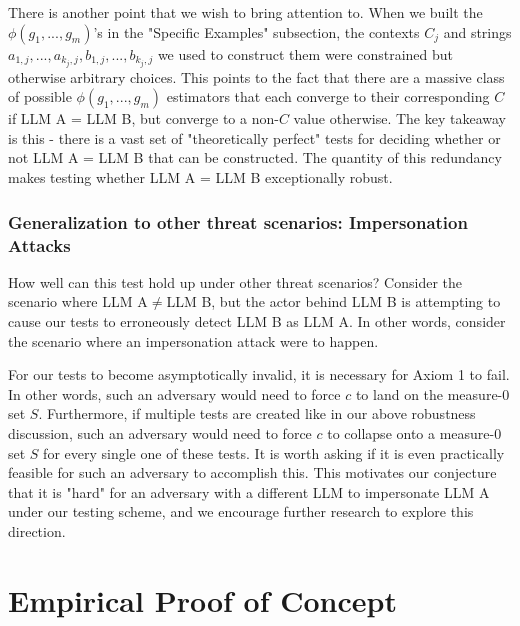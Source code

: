 \documentclass{article}
\begin{document}
There is another point that we wish to bring attention to. When we built the $\displaystyle \phi \left( g_{1} ,...,g_{m}\right)$'s in the "Specific Examples" subsection, the contexts $\displaystyle C_{j}$ and strings $\displaystyle a_{1,j} ,...,a_{k_{j} ,j} ,b_{1,j} ,...,b_{k_{j} ,j}$ we used to construct them were constrained but otherwise arbitrary choices. This points to the fact that there are a massive class of possible $\displaystyle \phi \left( g_{1} ,...,g_{m}\right)$ estimators that each converge to their corresponding $\displaystyle C$ if LLM A = LLM B, but converge to a non-$\displaystyle C$ value otherwise. The key takeaway is this - there is a vast set of "theoretically perfect" tests for deciding whether or not LLM A = LLM B that can be constructed. The quantity of this redundancy makes testing whether LLM A = LLM B exceptionally robust.



\subsubsection{Generalization to other threat scenarios: Impersonation Attacks}

How well can this test hold up under other threat scenarios? Consider the scenario where LLM A$\displaystyle \neq $LLM B, but the actor behind LLM B is attempting to cause our tests to erroneously detect LLM B as LLM A. In other words, consider the scenario where an impersonation attack were to happen.



For our tests to become asymptotically invalid, it is necessary for Axiom 1 to fail. In other words, such an adversary would need to force $\displaystyle c$ to land on the measure-0 set $\displaystyle S$. Furthermore, if multiple tests are created like in our above robustness discussion, such an adversary would need to force $\displaystyle c$ to collapse onto a measure-0 set $\displaystyle S$ for every single one of these tests. It is worth asking if it is even practically feasible for such an adversary to accomplish this. This motivates our conjecture that it is "hard" for an adversary with a different LLM to impersonate LLM A under our testing scheme, and we encourage further research to explore this direction.


\section{Empirical Proof of Concept}
\end{document}

